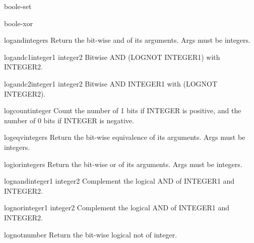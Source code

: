 \begin{constant}{boole-set}{}{}{}
  
\end{constant}

\begin{constant}{boole-xor}{}{}{}
  
\end{constant}

\begin{function}{logand}{\rest integers}{}{}
  Return the bit-wise and of its arguments. Args must be integers.
\end{function}

\begin{function}{logandc1}{integer1 integer2}{}{}
  Bitwise AND (LOGNOT INTEGER1) with INTEGER2.
\end{function}

\begin{function}{logandc2}{integer1 integer2}{}{}
  Bitwise AND INTEGER1 with (LOGNOT INTEGER2).
\end{function}

\begin{function}{logcount}{integer}{}{}
  Count the number of 1 bits if INTEGER is positive, and the number of 0 bits
  if INTEGER is negative.
\end{function}

\begin{function}{logeqv}{\rest integers}{}{}
  Return the bit-wise equivalence of its arguments. Args must be integers.
\end{function}

\begin{function}{logior}{\rest integers}{}{}
  Return the bit-wise or of its arguments. Args must be integers.
\end{function}

\begin{function}{lognand}{integer1 integer2}{}{}
  Complement the logical AND of INTEGER1 and INTEGER2.
\end{function}

\begin{function}{lognor}{integer1 integer2}{}{}
  Complement the logical AND of INTEGER1 and INTEGER2.
\end{function}

\begin{function}{lognot}{number}{}{}
  Return the bit-wise logical not of integer.
\end{function}

